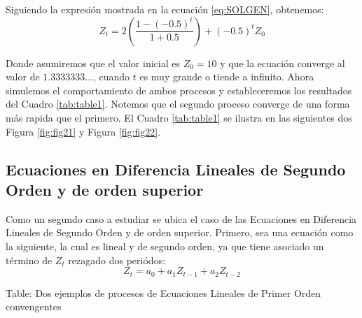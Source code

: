 \documentclass[
]{book}
\begin{document}
Siguiendo la expresión mostrada en la ecuación \eqref{eq:SOLGEN}, obtenemos:
\begin{equation}
    Z_t = 2 \left( \frac{1 - (-0.5)^{t}}{1 + 0.5} \right) + (-0.5)^t Z_0
\label{eq:ex4}
\end{equation}

Donde asumiremos que el valor inicial es \(Z_0 = 10\) y que la ecuación converge al valor de \(1.3333333 \ldots\), cuando \(t\) es muy grande o tiende a infinito. Ahora simulemos el comportamiento de ambos procesos y estableceremos los resultados del Cuadro \ref{tab:table1}. Notemos que el segundo proceso converge de una forma más rapida que el primero. El Cuadro \ref{tab:table1} se ilustra en las siguientes dos Figura \ref{fig:fig21} y Figura \ref{fig:fig22}.

\hypertarget{ecuaciones-en-diferencia-lineales-de-segundo-orden-y-de-orden-superior}{%
\subsection{Ecuaciones en Diferencia Lineales de Segundo Orden y de orden superior}\label{ecuaciones-en-diferencia-lineales-de-segundo-orden-y-de-orden-superior}}

Como un segundo caso a estudiar se ubica el caso de las Ecuaciones en Diferencia Lineales de Segundo Orden y de orden superior. Primero, sea una ecuación como la siguiente, la cual es lineal y de segundo orden, ya que tiene asociado un término de \(Z_t\) rezagado dos periódos:
\begin{equation}
    Z_t = a_0 + a_1 Z_{t-1} + a_2 Z_{t-2}
    \label{eq:EDSO}
\end{equation}

Table: \label{tab:foo} Dos ejemplos de procesos de Ecuaciones Lineales de Primer Orden convengentes
\end{document}
